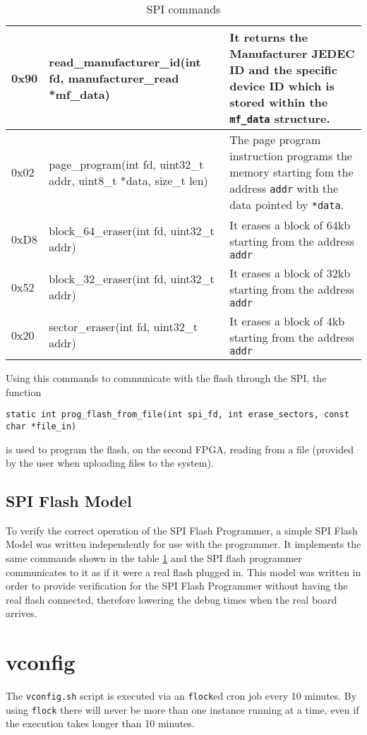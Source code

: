 \begin{table}[h!]
\begin{tabular}{ | l | l | p{6cm} |}
    0x90 & read\_manufacturer\_id(int fd, manufacturer\_read *mf\_data) & It returns the Manufacturer JEDEC ID and the specific device ID which is stored 
    within the \texttt{mf\_data} structure.\\ \hline
    0x02 & page\_program(int fd, uint32\_t addr, uint8\_t *data, size\_t len) & The page program instruction programs the memory starting fom the address
    \texttt{addr} with the data pointed by \texttt{*data}. \\ \hline
    0xD8 & block\_64\_eraser(int fd, uint32\_t addr) & It erases a block of 64kb starting from the address \texttt{addr}\\ \hline
    0x52 & block\_32\_eraser(int fd, uint32\_t addr) & It erases a block of 32kb starting from the address \texttt{addr}\\ \hline
    0x20 & sector\_eraser(int fd, uint32\_t addr) & It erases a block of 4kb starting from the address \texttt{addr}\\ \hline
    \end{tabular}
    \caption{SPI commands}
    \label{tab:spi_commands}
\end{table}

Using this commands to communicate with the flash through the SPI, the function 
\begin{lstlisting}
static int prog_flash_from_file(int spi_fd, int erase_sectors, const char *file_in)
\end{lstlisting}
is used to program the flash, on the second FPGA, reading from a file (provided by the user when uploading files to the system).

\subsection{SPI Flash Model}

To verify the correct operation of the SPI Flash Programmer, a simple SPI Flash
Model was written independently for use with the programmer. It implements the same commands shown in the 
table \ref{tab:spi_commands} and the SPI flash programmer communicates to it as if it were a real flash plugged in. This model
was written in order to provide verification for the SPI Flash Programmer without having the real flash connected, therefore lowering the debug times
when the real board arrives.

\newpage
\section{vconfig}
The \texttt{vconfig.sh} script is executed via an \texttt{flock}ed cron job every 10 minutes.
By using \texttt{flock} there will never be more than one instance running at a time, even if
the execution takes longer than 10 minutes.
\\

